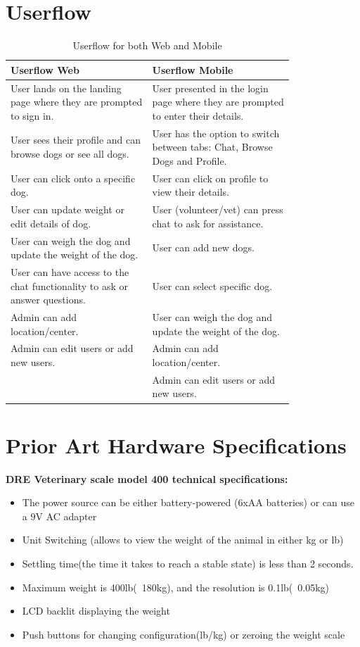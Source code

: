 \chapter{Userflow}\label{appendix:userflow}
\begin{table}[!ht]
    \centering
    \begin{tabular}{|p{0.4\linewidth}|p{0.4\linewidth}|}
    \hline
        \textbf{Userflow Web } & \textbf{Userflow Mobile } \\ \hline
        User lands on the landing page where they are prompted to sign in.  & User presented in the login page where they are prompted to enter their details.  \\ \hline
        User sees their profile and can browse dogs or see all dogs.  & User has the option to switch between tabs: Chat, Browse Dogs and Profile.  \\ \hline
        User can click onto a specific dog.  & User can click on profile to view their details.  \\ \hline
        User can update weight or edit details of dog.  & User (volunteer/vet) can press chat to ask for assistance.  \\ \hline
        User can weigh the dog and update the weight of the dog.  & User can add new dogs.  \\ \hline
        User can have access to the chat functionality to ask or answer questions.  & User can select specific dog.  \\ \hline
        Admin can add location/center.  & User can weigh the dog and update the weight of the dog.  \\ \hline
        Admin can edit users or add new users. & Admin can add location/center.  \\ \hline
          & Admin can edit users or add new users.  \\ \hline
    \end{tabular}
    \caption{Userflow for both Web and Mobile}
\end{table}

\chapter{Prior Art Hardware Specifications}\label{appendix:prior_art_hardware}
\textbf{DRE Veterinary scale model 400 technical specifications:}
\begin{itemize}
    \item The power source can be either battery-powered (6xAA batteries) or can use a 9V AC adapter
    \item Unit Switching (allows to view the weight of the animal in either kg or lb)
    \item Settling time(the time it takes to reach a stable state) is less than 2 seconds.
    \item Maximum weight is 400lb(~180kg), and the resolution is 0.1lb(~0.05kg)
    \item LCD backlit displaying the weight
    \item Push buttons for changing configuration(lb/kg) or zeroing the weight scale
\end{itemize}

